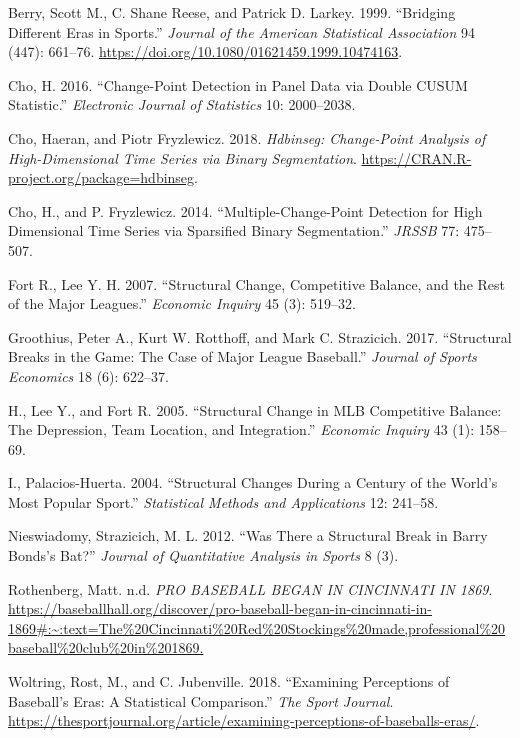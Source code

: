\documentclass[
  12pt,
]{article}
\newlength{\cslhangindent}
\newlength{\cslentryspacingunit} %
\newenvironment{CSLReferences}[2] %
 {%
  \setlength{\parindent}{0pt}
  \ifodd #1
  \let\oldpar\par
  \def\par{\hangindent=\cslhangindent\oldpar}
  \fi
  \setlength{\parskip}{#2\cslentryspacingunit}
 }%
 {}
\begin{document}
\hypertarget{refs}{}
\begin{CSLReferences}{1}{0}
\leavevmode{}%
Berry, Scott M., C. Shane Reese, and Patrick D. Larkey. 1999.
{``Bridging Different Eras in Sports.''} \emph{Journal of the American
Statistical Association} 94 (447): 661--76.
\url{https://doi.org/10.1080/01621459.1999.10474163}.

\leavevmode{}%
Cho, H. 2016. {``Change-Point Detection in Panel Data via Double CUSUM
Statistic.''} \emph{Electronic Journal of Statistics} 10: 2000--2038.

\leavevmode{}%
Cho, Haeran, and Piotr Fryzlewicz. 2018. \emph{Hdbinseg: Change-Point
Analysis of High-Dimensional Time Series via Binary Segmentation}.
\url{https://CRAN.R-project.org/package=hdbinseg}.

\leavevmode{}%
Cho, H., and P. Fryzlewicz. 2014. {``Multiple-Change-Point Detection for
High Dimensional Time Series via Sparsified Binary Segmentation.''}
\emph{JRSSB} 77: 475--507.

\leavevmode{}%
Fort R., Lee Y. H. 2007. {``Structural Change, Competitive Balance, and
the Rest of the Major Leagues.''} \emph{Economic Inquiry} 45 (3):
519--32.

\leavevmode{}%
Groothius, Peter A., Kurt W. Rotthoff, and Mark C. Strazicich. 2017.
{``Structural Breaks in the Game: The Case of Major League Baseball.''}
\emph{Journal of Sports Economics} 18 (6): 622--37.

\leavevmode{}%
H., Lee Y., and Fort R. 2005. {``Structural Change in MLB Competitive
Balance: The Depression, Team Location, and Integration.''}
\emph{Economic Inquiry} 43 (1): 158--69.

\leavevmode{}%
I., Palacios-Huerta. 2004. {``Structural Changes During a Century of the
World's Most Popular Sport.''} \emph{Statistical Methods and
Applications} 12: 241--58.

\leavevmode{}%
Nieswiadomy, Strazicich, M. L. 2012. {``Was There a Structural Break in
Barry Bonds's Bat?''} \emph{Journal of Quantitative Analysis in Sports}
8 (3).

\leavevmode{}%
Rothenberg, Matt. n.d. \emph{PRO BASEBALL BEGAN IN CINCINNATI IN 1869}.
\url{https://baseballhall.org/discover/pro-baseball-began-in-cincinnati-in-1869\#:~:text=The\%20Cincinnati\%20Red\%20Stockings\%20made,professional\%20baseball\%20club\%20in\%201869.}

\leavevmode{}%
Woltring, Rost, M., and C. Jubenville. 2018. {``Examining Perceptions of
Baseball's Eras: A Statistical Comparison.''} \emph{The Sport Journal}.
\url{https://thesportjournal.org/article/examining-perceptions-of-baseballs-eras/}.

\end{CSLReferences}
\end{document}
